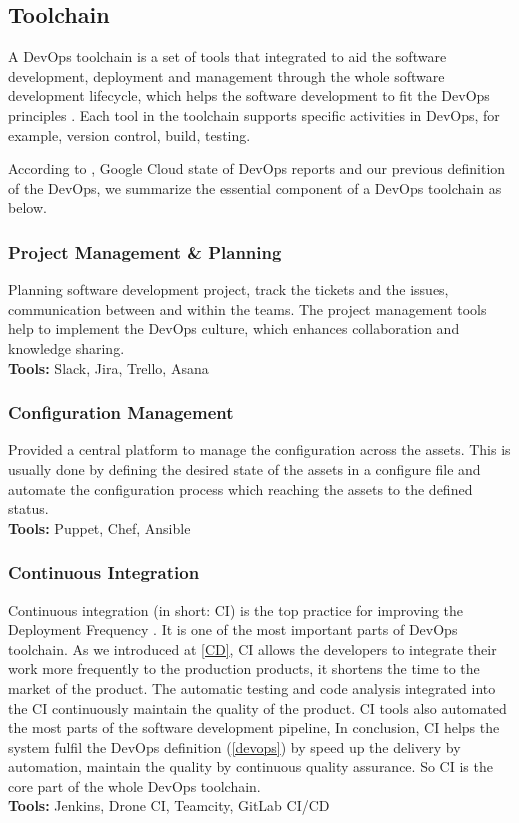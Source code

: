 \subsection{Toolchain}
A DevOps toolchain is a set of tools that integrated to aid the software development, deployment and management through the whole software development lifecycle, which helps the software development to fit the DevOps principles \cite{DevOpsto7:online}\cite{Toolchai10:online}\cite{WhatisaD20:online}. Each tool in the toolchain supports specific activities in DevOps, for example, version control, build, testing.
\par
According to \cite{WhatisaD20:online}, Google Cloud state of DevOps reports \cite{forsgrenaccelerate}\cite{velasquez2014state}\cite{forsgren20192019} and our previous definition of the DevOps, we summarize the essential component of a DevOps toolchain as below.
\subsubsection{Project Management \& Planning}
Planning software development project, track the tickets and the issues, communication between and within the teams. The project management tools help to implement the DevOps culture, which enhances collaboration and knowledge sharing.\\
\textbf{Tools:} Slack, Jira, Trello, Asana
\subsubsection{Configuration Management}
Provided a central platform to manage the configuration across the assets. This is usually done by defining the desired state of the assets in a configure file and automate the configuration process which reaching the assets to the defined status.\\
\textbf{Tools:} Puppet, Chef, Ansible
\subsubsection{Continuous Integration}
Continuous integration (in short: CI) is the top practice for improving the Deployment Frequency \cite{velasquez2014state}. It is one of the most important parts of DevOps toolchain. As we introduced at \ref{CD}, CI allows the developers to integrate their work more frequently to the production products, it shortens the time to the market of the product. The automatic testing and code analysis integrated into the CI continuously maintain the quality of the product. CI tools also automated the most parts of the software development pipeline, In conclusion, CI helps the system fulfil the DevOps definition (\ref{devops}) by speed up the delivery by automation, maintain the quality by continuous quality assurance. So CI is the core part of the whole DevOps toolchain.\\
\textbf{Tools:} Jenkins, Drone CI, Teamcity, GitLab CI/CD
